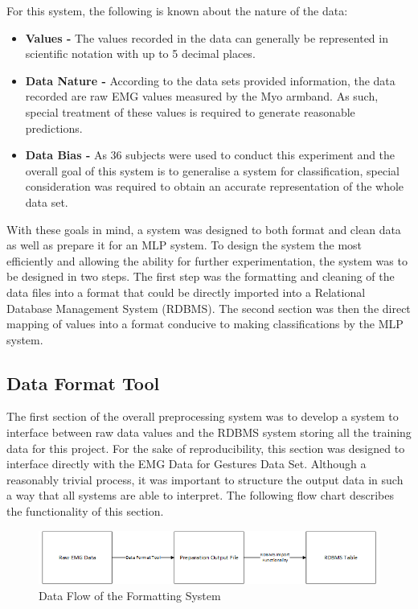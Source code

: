 \documentclass[11pt]{article}
\begin{document}
	\noindent
	For this system, the following is known about the nature of the data:
	
	\begin{itemize}
		\item \textbf{Values - } The values recorded in the data can generally be represented in scientific notation with up to 5 decimal places. 
		\item \textbf{Data Nature - } According to the data sets provided information\cite{Lobov2018}, the data recorded are raw EMG values measured by the Myo armband. As such, special treatment of these values is required to  generate reasonable predictions.
		\item \textbf{Data Bias - } As 36 subjects were used to conduct this experiment and the overall goal of this system is to generalise a system for classification, special consideration was required to obtain an accurate representation of the whole data set.
	\end{itemize}

	\noindent
	With these goals in mind, a system was designed to both format and clean data as well as prepare it for an MLP system. To design the system the most efficiently and allowing the ability for further experimentation, the system was to be designed in two steps. The first step was the formatting and cleaning of the data files into a format that could be directly imported into a Relational Database Management System (RDBMS). The second section was then the direct mapping of values into a format conducive to making classifications by the MLP system. 
	
	\subsection{Data Format Tool} \label{sec:data_format}
	The first section of the overall preprocessing system was to develop a system to interface between raw data values and the RDBMS system storing all the training data for this project. For the sake of reproducibility, this section was designed to interface directly with the EMG Data for Gestures Data Set. Although a reasonably trivial process, it was important to structure the output data in such a way that all systems are able to interpret. The following flow chart describes the functionality of this section.	\\
	\begin{figure}[H]
		\centering
		\includegraphics[width=15cm]{Figures/format_system}
		\caption{Data Flow of the Formatting System}
		\label{fig:data_format}
	\end{figure}
\end{document}
